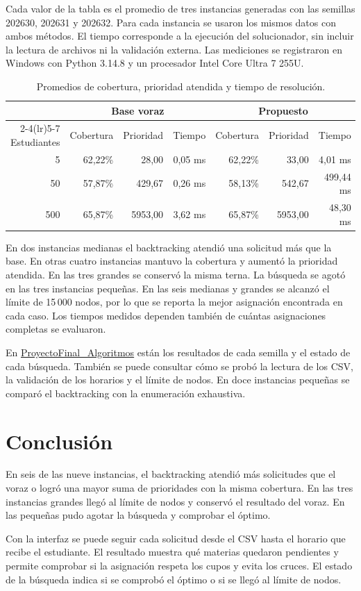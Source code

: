 \documentclass[11pt]{article}
\newcommand{\repo}{\href{https://github.com/Segiraldo0610/ProyectoFinal_Algoritmos}{ProyectoFinal\_Algoritmos}}
\numberwithin{equation}{section}
\numberwithin{figure}{section}
\numberwithin{table}{section}
\theoremstyle{definition}
\begin{document}
Cada valor de la tabla es el promedio de tres instancias generadas con las
semillas 202630, 202631 y 202632. Para cada instancia se usaron los mismos
datos con ambos métodos. El tiempo corresponde a la ejecución del
solucionador, sin incluir la lectura de archivos ni la validación externa.
Las mediciones se registraron en Windows con Python 3.14.8 y un procesador
Intel Core Ultra 7 255U.

\begin{table}[H]
\centering
\caption{Promedios de cobertura, prioridad atendida y tiempo de resolución.}
\small
\begin{tabular}{r rrr rrr}
\toprule
 & \multicolumn{3}{c}{Base voraz} & \multicolumn{3}{c}{Propuesto} \\
\cmidrule(lr){2-4}\cmidrule(lr){5-7}
Estudiantes & Cobertura & Prioridad & Tiempo & Cobertura & Prioridad & Tiempo \\
\midrule
5   & 62,22\% & 28,00   & 0,05 ms & 62,22\% & 33,00   & 4,01 ms \\
50  & 57,87\% & 429,67  & 0,26 ms & 58,13\% & 542,67  & 499,44 ms \\
500 & 65,87\% & 5953,00 & 3,62 ms & 65,87\% & 5953,00 & 48,30 ms \\
\bottomrule
\end{tabular}
\end{table}

En dos instancias medianas el backtracking atendió una solicitud más
que la base. En otras cuatro instancias mantuvo la cobertura y aumentó
la prioridad atendida. En las tres grandes se conservó la misma terna.
La búsqueda se agotó en las tres instancias pequeñas. En las seis
medianas y grandes se alcanzó el límite de 15\,000 nodos, por lo que
se reporta la mejor asignación encontrada en cada caso. Los tiempos
medidos dependen también de cuántas asignaciones completas se evaluaron.

En \repo{} están los resultados de cada semilla y el estado de cada
búsqueda. También se puede consultar cómo se probó la lectura de los
CSV, la validación de los horarios y el límite de nodos. En doce
instancias pequeñas se comparó el backtracking con la enumeración
exhaustiva.

\section{Conclusión}

En seis de las nueve instancias, el backtracking atendió más
solicitudes que el voraz o logró una mayor suma de prioridades con la
misma cobertura. En las tres instancias grandes llegó al límite de
nodos y conservó el resultado del voraz. En las pequeñas pudo agotar
la búsqueda y comprobar el óptimo.

Con la interfaz se puede seguir cada solicitud desde el CSV hasta el
horario que recibe el estudiante. El resultado muestra qué materias
quedaron pendientes y permite comprobar si la asignación respeta los
cupos y evita los cruces. El estado de la búsqueda indica si se
comprobó el óptimo o si se llegó al límite de nodos.
\end{document}
